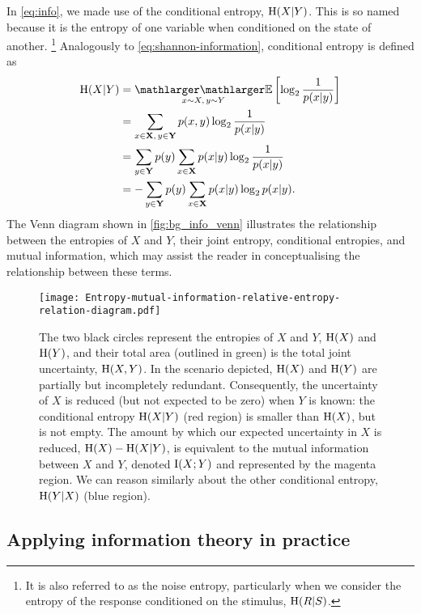 In \autoref{eq:info}, we made use of the conditional entropy, $\operatorname{H}(X | Y)$.
This is so named because it is the entropy of one variable when conditioned on the state of another.%
\footnote{It is also referred to as the noise entropy, particularly when we consider the entropy of the response conditioned on the stimulus, $\operatorname{H}(R|S)$.}
Analogously to \autoref{eq:shannon-information}, conditional entropy is defined as
\begin{align}
\HH(X | Y)
  &= \EE_{x\sim X, \, y\sim Y} \left[ \log_2 \frac{1}{p(x|y)} \right] \notag
\\&= \sum_{x \in \SET{X}, \, y \in \SET{Y}} p(x,y) \log_2 \frac{1}{p(x|y)} \notag
\\&= \sum_{y \in \SET{Y}} p(y) \sum_{x \in \SET{X}} p(x|y) \log_2 \frac{1}{p(x|y)} \notag
\\&= - \sum_{y \in \SET{Y}} p(y) \sum_{x \in \SET{X}} p(x|y) \log_2 p(x|y)
.\end{align}
The Venn diagram shown in \autoref{fig:bg_info_venn} illustrates the relationship between the entropies of $X$ and $Y$, their joint entropy, conditional entropies, and mutual information, which may assist the reader in conceptualising the relationship between these terms.

\begin{figure}[htbp]
\centering
\texttt{[image: Entropy-mutual-information-relative-entropy-relation-diagram.pdf]}
\caption{
The two black circles represent the entropies of $X$ and $Y$, $\operatorname{H}(X)$ and $\operatorname{H}(Y)$, and their total area (outlined in green) is the total joint uncertainty, $\operatorname{H}(X, Y)$.
In the scenario depicted, $\operatorname{H}(X)$ and $\operatorname{H}(Y)$ are partially but incompletely redundant.
Consequently, the uncertainty of $X$ is reduced (but not expected to be zero) when $Y$ is known: the conditional entropy $\operatorname{H}(X|Y)$ (red region) is smaller than $\operatorname{H}(X)$, but is not empty.
The amount by which our expected uncertainty in $X$ is reduced, $\operatorname{H}(X) - \operatorname{H}(X|Y)$, is equivalent to the mutual information between $X$ and $Y$, denoted $\operatorname{I}(X;Y)$ and represented by the magenta region.
We can reason similarly about the other conditional entropy, $\operatorname{H}(Y|X)$ (blue region).
}
\label{fig:bg_info_venn}
\end{figure}


\subsection{Applying information theory in practice}

